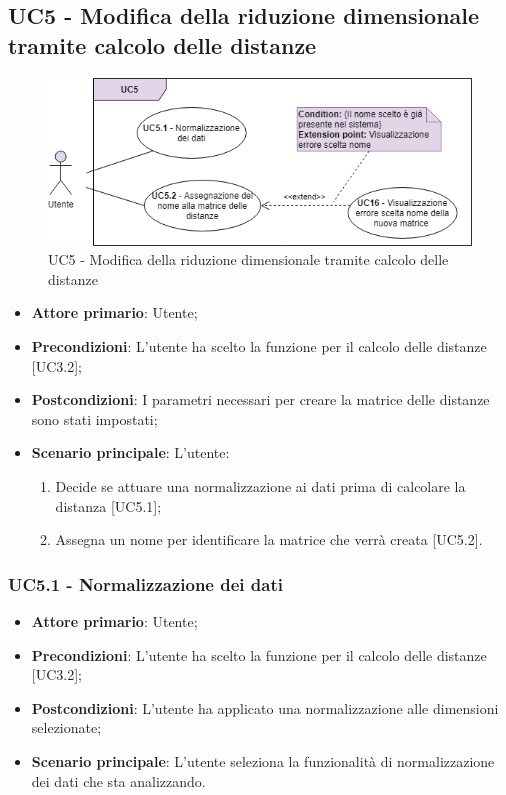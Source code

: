 \subsection{UC5 - Modifica della riduzione dimensionale tramite calcolo delle distanze}
\begin{figure}[h]
\includegraphics[width=17cm]{Section/Images/UC5.png}
\centering
\caption{UC5 - Modifica della riduzione dimensionale tramite calcolo delle distanze}
\end{figure}
\begin{itemize}
	\item \textbf{Attore primario}: Utente;
	\item \textbf{Precondizioni}: L'utente ha scelto la funzione per il calcolo delle distanze [UC3.2];
	\item \textbf{Postcondizioni}: I parametri necessari per creare la matrice delle distanze sono stati impostati;
	\item \textbf{Scenario principale}: L'utente:
	
	\begin{enumerate}
		\item Decide se attuare una normalizzazione ai dati prima di calcolare la distanza [UC5.1];
		\item Assegna un nome per identificare la matrice che verrà creata [UC5.2].
	\end{enumerate}		
\end{itemize}

\subsubsection{UC5.1 - Normalizzazione dei dati}

\begin{itemize}
	\item \textbf{Attore primario}: Utente;
	
	\item \textbf{Precondizioni}: L'utente ha scelto la funzione per il calcolo delle distanze [UC3.2];
	
	\item \textbf{Postcondizioni}: L'utente ha applicato una normalizzazione alle dimensioni selezionate;
	
	\item \textbf{Scenario principale}: L'utente seleziona la funzionalità di normalizzazione dei dati che sta analizzando.
\end{itemize}		

